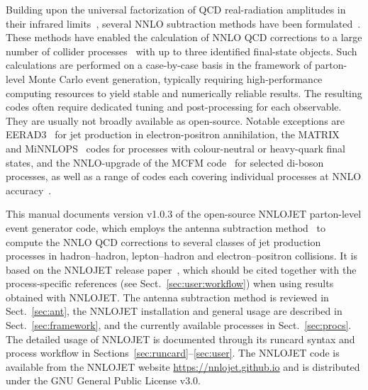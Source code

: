 \documentclass{SciPost}
\newcommand{\nnlojetversion}{1.0.3}
\newcommand{\myurl}[1]{\href{#1}{#1}}
\begin{document}
Building upon the universal factorization of QCD real-radiation amplitudes in their infrared
limits~\cite{Campbell:1997hg,Catani:1999ss,Catani:2000pi,Kosower:1999rx,Bern:1999ry}, several
NNLO subtraction methods have been
formulated~\cite{Binoth:2004jv,Anastasiou:2003gr,Catani:2007vq,Gehrmann-DeRidder:2005btv,Czakon:2010td,Boughezal:2011jf,Boughezal:2015eha,Gaunt:2015pea,Cacciari:2015jma,Caola:2017dug,DelDuca:2016ily,Magnea:2020trj}.
These methods have enabled the calculation of
NNLO QCD corrections to a large number of collider processes~\cite{Heinrich:2020ybq}
with up to three identified final-state objects. Such calculations are performed
on a case-by-case basis in the framework of parton-level Monte Carlo event generation, typically requiring
high-performance computing resources to yield stable and numerically reliable results. The resulting codes
often require dedicated tuning and post-processing for each observable. They are usually not broadly
available as open-source. Notable exceptions are
\textsc{EERAD3}~\cite{Gehrmann-DeRidder:2014hxk,Aveleira:2025svg} for jet production in electron-positron annihilation, the \textsc{MATRIX}~\cite{Grazzini:2017mhc} and MiNNLOPS~\cite{Monni:2019whf,Monni:2020nks}
codes  for
processes with colour-neutral or heavy-quark final states,
 and the NNLO-upgrade of the \textsc{MCFM} code~\cite{Campbell:2019dru,Campbell:2022gdq} for selected di-boson processes, as well as a range of codes each covering individual processes at NNLO accuracy~\cite{Catani:2007vq,Anastasiou:2003yy,Catani:2009sm,Gavin:2010az,Catani:2011qz,Cacciari:2015jma,Camarda:2019zyx,DelDuca:2024ovc,Sherpa:2024mfk}.


This manual documents version v\nnlojetversion{} of the open-source NNLOJET parton-level event generator
code, which employs the antenna subtraction method~\cite{Gehrmann-DeRidder:2005btv,Daleo:2006xa,Currie:2013vh}
to compute the NNLO QCD  corrections to several classes of jet production processes in hadron--hadron,
lepton--hadron and electron--positron collisions.
It is based on the NNLOJET release paper~\cite{NNLOJET:2025rno}, which should be cited together with the process-specific references (see Sect.~\ref{sec:user:workflow}) when using results obtained with NNLOJET.
The antenna subtraction method is reviewed in Sect.~\ref{sec:ant}, the
NNLOJET installation and general usage are described in Sect.~\ref{sec:framework}, and the currently available processes in
Sect.~\ref{sec:procs}. The detailed usage of NNLOJET is documented through its
runcard syntax and process workflow in Sections~\ref{sec:runcard}--\ref{sec:user}. The NNLOJET code
is available from the NNLOJET website \myurl{https://nnlojet.github.io} and is distributed under the GNU General Public License v3.0.
\end{document}
